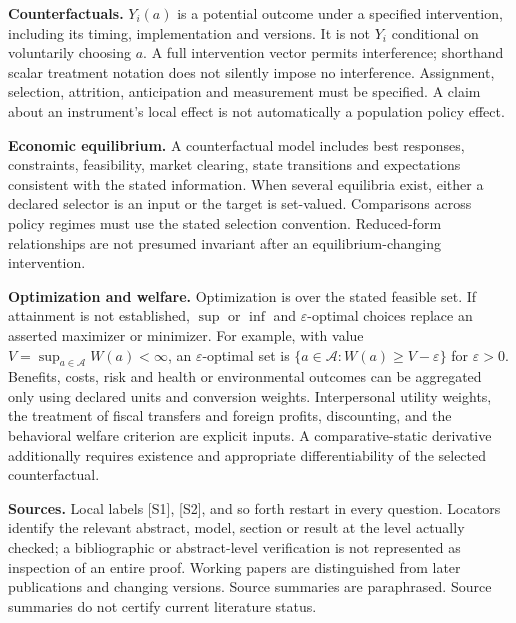 \documentclass[11pt,a4paper]{article}
\begin{document}
\textbf{Counterfactuals.} $Y_i(a)$ is a potential outcome under a specified intervention, including its timing, implementation and versions. It is not $Y_i$ conditional on voluntarily choosing $a$. A full intervention vector permits interference; shorthand scalar treatment notation does not silently impose no interference. Assignment, selection, attrition, anticipation and measurement must be specified. A claim about an instrument's local effect is not automatically a population policy effect.

\textbf{Economic equilibrium.} A counterfactual model includes best responses, constraints, feasibility, market clearing, state transitions and expectations consistent with the stated information. When several equilibria exist, either a declared selector is an input or the target is set-valued. Comparisons across policy regimes must use the stated selection convention. Reduced-form relationships are not presumed invariant after an equilibrium-changing intervention.

\textbf{Optimization and welfare.} Optimization is over the stated feasible set. If attainment is not established, $\sup$ or $\inf$ and $\varepsilon$-optimal choices replace an asserted maximizer or minimizer. For example, with value $V=\sup_{a\in\mathcal A}W(a)<\infty$, an $\varepsilon$-optimal set is $\{a\in\mathcal A:W(a)\geq V-\varepsilon\}$ for $\varepsilon>0$. Benefits, costs, risk and health or environmental outcomes can be aggregated only using declared units and conversion weights. Interpersonal utility weights, the treatment of fiscal transfers and foreign profits, discounting, and the behavioral welfare criterion are explicit inputs. A comparative-static derivative additionally requires existence and appropriate differentiability of the selected counterfactual.

\textbf{Sources.} Local labels [S1], [S2], and so forth restart in every question. Locators identify the relevant abstract, model, section or result at the level actually checked; a bibliographic or abstract-level verification is not represented as inspection of an entire proof. Working papers are distinguished from later publications and changing versions. Source summaries are paraphrased. Source summaries do not certify current literature status.
\end{document}
